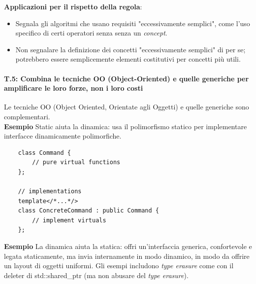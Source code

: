 \textsf{\small \textbf{Applicazioni per il rispetto della regola}: }

\begin{itemize}
	\item \textsf{\small Segnala gli algoritmi che usano requisiti "eccessivamente semplici", come l'uso specifico di certi operatori senza senza un \emph{concept}.}
	\item \textsf{\small Non segnalare la definizione dei concetti "eccessivamente semplici" di per se; potrebbero essere semplicemente elementi costitutivi per concetti più utili.}
\end{itemize}

\paragraph{T.5: Combina le tecniche OO (Object-Oriented) e quelle generiche per amplificare le loro forze, non i loro costi}

\textsf{\small Le tecniche OO (Object Oriented, Orientate agli Oggetti) e quelle generiche sono complementari. } \\

\textsf{\small \textbf{Esempio} Static aiuta la dinamica: usa il polimorfismo statico per implementare interfacce dinamicamente polimorfiche.} \\

\begin{lstlisting}
	class Command {
		// pure virtual functions
	};
	
	// implementations
	template</*...*/>
	class ConcreteCommand : public Command {
		// implement virtuals
	};
\end{lstlisting}

\textsf{\small \textbf{Esempio} La dinamica aiuta la statica: offri un'interfaccia generica, confortevole e legata staticamente, ma invia internamente in modo dinamico, in modo da offrire un layout di oggetti uniformi. Gli esempi includono \emph{type erasure} come con il deleter di std::shared\_ptr (ma non abusare del \emph{type erasure}).} \\

